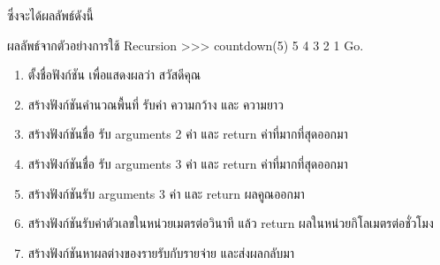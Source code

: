 ซึ่งจะได้ผลลัพธ์ดังนี้
\begin{codelist}{ผลลัพธ์จากตัวอย่างการใช้ Recursion}{}
>>> countdown(5)
5
4
3
2
1
Go.
\end{codelist}

\begin{enumerate} 

\item ตั้งชื่อฟังก์ชัน  เพื่อแสดงผลว่า สวัสดีคุณ
\item สร้างฟังก์ชันคำนวณพื้นที่ รับค่า ความกว้าง และ ความยาว
\item สร้างฟังก์ชันชื่อ   รับ arguments 2 ค่า และ return ค่าที่มากที่สุดออกมา
\item สร้างฟังก์ชันชื่อ   รับ arguments 3 ค่า และ return ค่าที่มากที่สุดออกมา
\item สร้างฟังก์ชันรับ arguments 3 ค่า และ return ผลคูณออกมา
\item สร้างฟังก์ชันรับค่าตัวเลขในหน่วยเมตรต่อวินาที แล้ว return ผลในหน่วยกิโลเมตรต่อชั่วโมง
\item สร้างฟังก์ชันหาผลต่างของรายรับกับรายจ่าย และส่งผลกลับมา

\end{enumerate}


